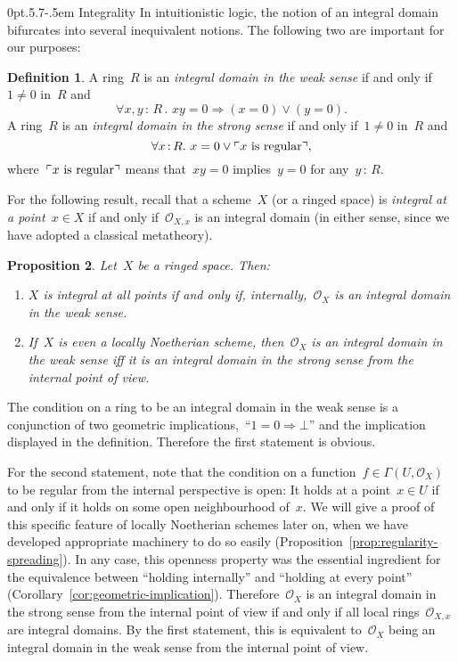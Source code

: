 \documentclass[10pt,reqno,a4paper]{amsbook}
\makeatletter
\theoremstyle{definition}
\newtheorem{defn}{Definition}[section]
\theoremstyle{plain}
\newtheorem{prop}[defn]{Proposition}
\theoremstyle{remark}
\renewcommand{\O}{\mathcal{O}}
\newcommand{\?}{\,{:}\,}
\renewcommand{\_}{\mathpunct{.}\,}
\newcommand{\speak}[1]{\ulcorner\text{\textnormal{#1}}\urcorner}
\renewenvironment{proof}[1][\proofname]{\par
  \pushQED{\qed}%
  \normalfont \topsep6\p@\@plus6\p@\relax
  \trivlist
  \item[\hskip\labelsep
        \itshape
    #1\@addpunct{.}]\ignorespaces
}{%
  \popQED\endtrivlist\@endpefalse
}
\def\subsection{\@startsection{subsection}{2}%
  {0pt}{.5\linespacing\@plus.7\linespacing}{-.5em}%
  {\normalfont\bfseries}}
\makeatother
\begin{document}
\subsection{Integrality}\label{sect:integrality}
In intuitionistic logic, the notion of an integral
domain bifurcates into several inequivalent notions. The following two are
important for our purposes:
\begin{defn}A ring~$R$ is an \emph{integral domain in the weak sense} if and
only if~$1 \neq 0$ in~$R$ and
\[ \forall x,y\?R\_ xy = 0 \Longrightarrow (x = 0) \vee (y = 0). \]
A ring~$R$ is an \emph{integral domain in the strong sense} if and only if~$1
\neq 0$ in~$R$ and
\[ \forall x\?R\_ x = 0 \vee \speak{$x$ is regular}, \]
where~$\speak{$x$ is regular}$ means that~$xy = 0$ implies~$y = 0$ for any~$y \?
R$.\end{defn}

For the following result, recall that a scheme~$X$ (or a ringed space) is
\emph{integral at a point~$x \in X$} if and only if~$\O_{X,x}$ is an integral
domain (in either sense, since we have adopted a classical metatheory).

\begin{prop}\label{prop:internal-integrality}
Let~$X$ be a ringed space. Then:
\begin{enumerate}
\item $X$ is integral at all points if and only if, internally,~$\O_X$ is an
integral domain in the weak sense.
\item If~$X$ is even a locally Noetherian scheme, then~$\O_X$ is an integral
domain in the weak sense iff it is an integral domain in the strong sense from
the internal point of view.
\end{enumerate}
\end{prop}
\begin{proof}The condition on a ring to be an integral domain in the weak sense
is a conjunction of two geometric implications,~``$1 = 0 \Rightarrow \bot$''
and the implication displayed in the definition. Therefore the first statement
is obvious.

For the second statement, note that the condition on a function~$f \in
\Gamma(U,\O_X)$ to be regular from the internal perspective is open: It holds
at a point~$x \in U$ if and only if it holds on some open neighbourhood of~$x$.
We will give a proof of this specific feature of locally Noetherian schemes
later on, when we have developed appropriate machinery to do so easily
(Proposition~\ref{prop:regularity-spreading}). In any case, this openness
property was the essential ingredient for the equivalence between ``holding
internally'' and ``holding at every point''
(Corollary~\ref{cor:geometric-implication}). Therefore~$\O_X$ is an integral
domain in the strong sense from the internal point of view if and only if all
local rings~$\O_{X,x}$ are integral domains. By the first statement, this is
equivalent to~$\O_X$ being an integral domain in the weak sense from the
internal point of view.
\end{proof}
\end{document}
